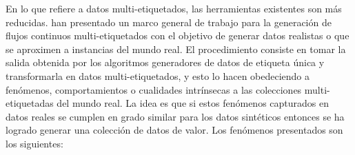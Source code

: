 En lo que refiere a datos multi-etiquetados, las herramientas existentes son más
reducidas. \citeauthor{read_generating_2009} han presentado un marco general
de trabajo para la generación de flujos continuos multi-etiquetados
\cite{read_generating_2009} con el objetivo de generar datos realistas o que
se aproximen a instancias del mundo real. El procedimiento consiste en tomar la
salida obtenida por los algoritmos generadores de datos de etiqueta única y
transformarla en datos multi-etiquetados, y esto lo hacen obedeciendo a
fenómenos, comportamientos o cualidades intrínsecas a las colecciones
multi-etiquetadas del mundo real. La idea es que si estos fenómenos capturados
en datos reales se cumplen en grado similar para los datos sintéticos entonces
se ha logrado generar una colección de datos de valor. Los fenómenos presentados
son los siguientes:

